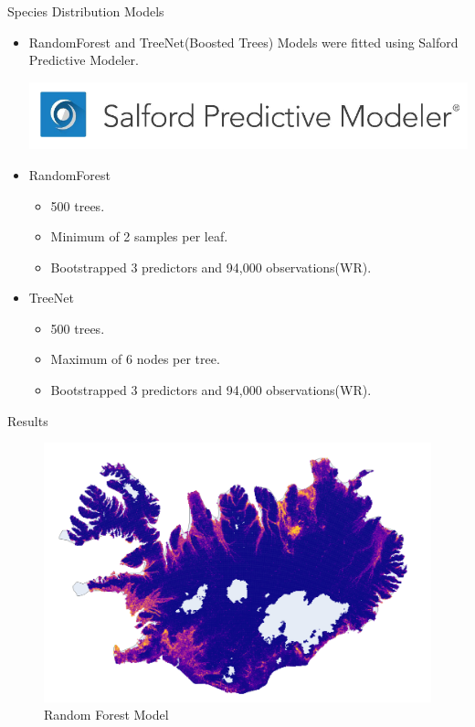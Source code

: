 \documentclass[10pt]{beamer}
\begin{document}
\begin{frame}{Species Distribution Models}
    \begin{itemize}
        \item RandomForest and TreeNet(Boosted Trees) Models were fitted using Salford Predictive Modeler. 
        \begin{center}
            \includegraphics[width = .5\textwidth]{SPM image.png}
        \end{center}
        \vfill
        \item RandomForest
        \begin{itemize}
            \item 500 trees.
            \item Minimum of 2 samples per leaf. 
            \item Bootstrapped 3 predictors and 94,000 observations(WR).
        \end{itemize}
        \vfill
        \item TreeNet
        \begin{itemize}
            \item 500 trees. 
            \item Maximum of 6 nodes per tree.
            \item Bootstrapped 3 predictors and 94,000 observations(WR).
        \end{itemize}
    \end{itemize}
\end{frame}





\begin{frame}{Results}
    \begin{figure}
    \begin{center}
    \includegraphics[width = .9\textwidth]{figRFMrio.png}
    \caption{Random Forest Model}
\end{center}
\end{figure}
\end{frame}
\end{document}
